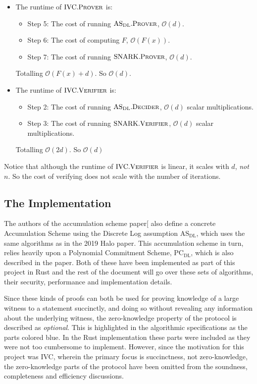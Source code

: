 \documentclass[
]{article}
\providecommand{\tightlist}{%
  \setlength{\itemsep}{0pt}\setlength{\parskip}{0pt}}
\newcommand*\Oc{\mathcal{O}}
\newcommand{\textblue}[1]{\textcolor{GbBlueDk}{#1}}
\newcommand*{\Prover}{\mathrm{\text{P\scriptsize ROVER}}}
\newcommand*{\Verifier}{\mathrm{\text{V\scriptsize ERIFIER}}}
\newcommand*{\SNARKProver}{\mathrm{\text{SNARK}}.\Prover}
\newcommand*{\SNARKVerifier}{\mathrm{\text{SNARK}}.\Verifier}
\newcommand*{\IVCProver}{\mathrm{\text{IVC}}.\Prover}
\newcommand*{\IVCVerifier}{\mathrm{\text{IVC}}.\Verifier}
\newcommand*{\PCDL}{\text{PC}_{\text{DL}}}
\newcommand*{\ASDL}{\text{AS}_{\text{DL}}}
\newcommand*{\ASDLProver}{\ASDL.\mathrm{\text{P\scriptsize ROVER}}}
\newcommand*{\ASDLDecider}{\ASDL.\mathrm{\text{D\scriptsize ECIDER}}}
\begin{document}
\begin{itemize}
\tightlist
\item
  The runtime of \(\IVCProver\) is:

  \begin{itemize}
  \tightlist
  \item
    Step 5: The cost of running \(\ASDLProver\), \(\Oc(d)\).
  \item
    Step 6: The cost of computing \(F\), \(\Oc(F(x))\).
  \item
    Step 7: The cost of running \(\SNARKProver\), \(\Oc(d)\).
  \end{itemize}

  Totalling \(\Oc(F(x) + d)\). So \(\Oc(d)\).
\item
  The runtime of \(\IVCVerifier\) is:

  \begin{itemize}
  \tightlist
  \item
    Step 2: The cost of running \(\ASDLDecider\), \(\Oc(d)\) scalar
    multiplications.
  \item
    Step 3: The cost of running \(\SNARKVerifier\), \(\Oc(d)\) scalar
    multiplications.
  \end{itemize}

  Totalling \(\Oc(2d)\). So \(\Oc(d)\)
\end{itemize}

Notice that although the runtime of \(\IVCVerifier\) is linear, it
scales with \(d\), \emph{not} \(n\). So the cost of verifying does not
scale with the number of iterations.

\subsection{The Implementation}\label{the-implementation}

The authors of the accumulation scheme paper{[}\citeproc{ref-pcd}{Bünz
et al. 2020}{]} also define a concrete Accumulation Scheme using the
Discrete Log assumption \(\ASDL\), which uses the same algorithms as in
the 2019 Halo paper. This accumulation scheme in turn, relies heavily
upon a Polynomial Commitment Scheme, \(\PCDL\), which is also described
in the paper. Both of these have been implemented as part of this
project in Rust and the rest of the document will go over these sets of
algorithms, their security, performance and implementation details.

Since these kinds of proofs can both be used for proving knowledge of a
large witness to a statement succinctly, and doing so without revealing
any information about the underlying witness, the zero-knowledge
property of the protocol is described as \emph{optional}. This is
highlighted in the algorithmic specifications as the parts colored
\textblue{blue}. In the Rust implementation these parts were included as
they were not too cumbersome to implement. However, since the motivation
for this project was IVC, wherein the primary focus is succinctness, not
zero-knowledge, the zero-knowledge parts of the protocol have been
omitted from the soundness, completeness and efficiency discussions.
\end{document}
